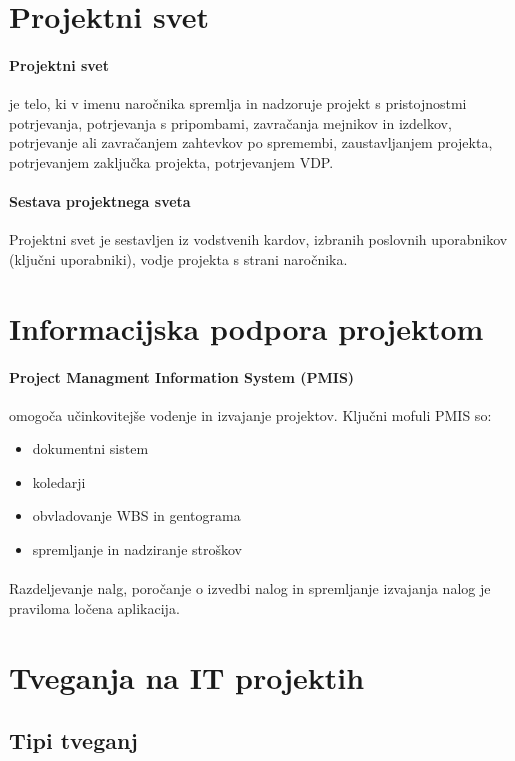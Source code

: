 \documentclass[a4paper,12pt]{report}
\begin{document}
   \section{Projektni svet}
      \paragraph{Projektni svet} je telo, ki v imenu naročnika spremlja in nadzoruje projekt s pristojnostmi potrjevanja, potrjevanja s pripombami, zavračanja mejnikov in izdelkov, potrjevanje ali zavračanjem zahtevkov po spremembi, zaustavljanjem projekta, potrjevanjem zaključka projekta, potrjevanjem VDP.
      \paragraph{Sestava projektnega sveta} Projektni svet je sestavljen iz vodstvenih kardov, izbranih poslovnih uporabnikov (ključni uporabniki), vodje projekta s strani naročnika.

   \section{Informacijska podpora projektom}
      \paragraph{Project Managment Information System (PMIS)} omogoča učinkovitejše vodenje in izvajanje projektov. Ključni mofuli PMIS so:
         \begin{itemize}
            \item dokumentni sistem
            \item koledarji
            \item obvladovanje WBS in gentograma
            \item spremljanje in nadziranje stroškov
         \end{itemize}
      \paragraph{} Razdeljevanje nalg, poročanje o izvedbi nalog in spremljanje izvajanja nalog je praviloma ločena aplikacija.

   \section{Tveganja na IT projektih}
      \subsection{Tipi tveganj}
\end{document}
